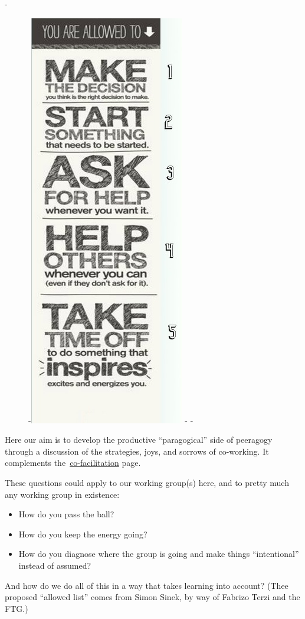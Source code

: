 -\begin{figure}
-\includegraphics[width=.4\textwidth]{./pictures/allowed-list.jpg}
-\vspace{-50pt}
-\end{figure} Here our aim is to develop the productive ``paragogical'' side of
peeragogy through a discussion of the strategies, joys, and sorrows of
co-working. It complements
the~\href{http://socialmediaclassroom.com/host/peeragogy/freelinking/Co-Working}{co-facilitation}
page.

These questions could apply to our working group(s) here, and to pretty
much any working group in existence:

\begin{itemize}
\item
  How do you pass the ball?
\item
  How do you keep the energy going?
\item
  How do you diagnose where the group is going and make things
  ``intentional'' instead of assumed?
\end{itemize}

And how do we do all of this in a way that takes learning into account?
(Thee proposed ``allowed list'' comes from Simon Sinek, by way of
Fabrizo Terzi and the FTG.)

